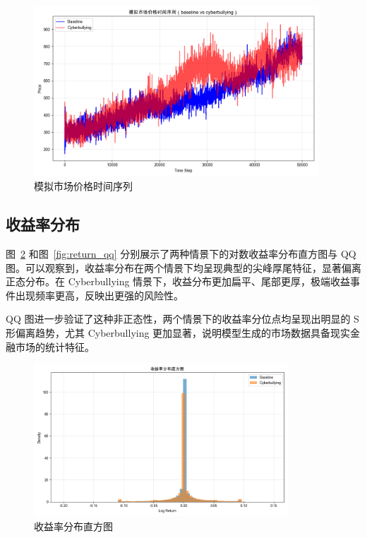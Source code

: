 \begin{figure}[htbp]
    \centering
    \includegraphics[width=0.95\textwidth]{image/fig4_1_price_evolution.png}
    \caption{模拟市场价格时间序列}
    \label{fig:price_evolution}
\end{figure}

\subsection{收益率分布}

图~\ref{fig:return_hist} 和图~\ref{fig:return_qq} 分别展示了两种情景下的对数收益率分布直方图与 QQ 图。可以观察到，收益率分布在两个情景下均呈现典型的尖峰厚尾特征，显著偏离正态分布。在 Cyberbullying 情景下，收益分布更加扁平、尾部更厚，极端收益事件出现频率更高，反映出更强的风险性。

QQ 图进一步验证了这种非正态性，两个情景下的收益率分位点均呈现出明显的 S 形偏离趋势，尤其 Cyberbullying 更加显著，说明模型生成的市场数据具备现实金融市场的统计特征。

\begin{figure}[htbp]
    \centering
    \includegraphics[width=0.85\textwidth]{image/fig4_2_return_hist.png}
    \caption{收益率分布直方图}
    \label{fig:return_hist}
\end{figure}

